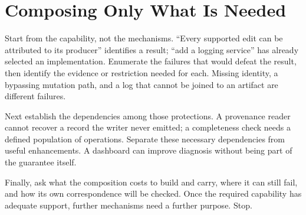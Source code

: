 \section{Composing Only What Is Needed}\label{heading:handbook-composition-procedure}

Start from the capability, not the mechanisms. “Every supported edit can be attributed to its producer” identifies a result; “add a logging service” has already selected an implementation. Enumerate the failures that would defeat the result, then identify the evidence or restriction needed for each. Missing identity, a bypassing mutation path, and a log that cannot be joined to an artifact are different failures.

Next establish the dependencies among those protections. A provenance reader cannot recover a record the writer never emitted; a completeness check needs a defined population of operations. Separate these necessary dependencies from useful enhancements. A dashboard can improve diagnosis without being part of the guarantee itself.

Finally, ask what the composition costs to build and carry, where it can still fail, and how its own correspondence will be checked. Once the required capability has adequate support, further mechanisms need a further purpose. Stop.
